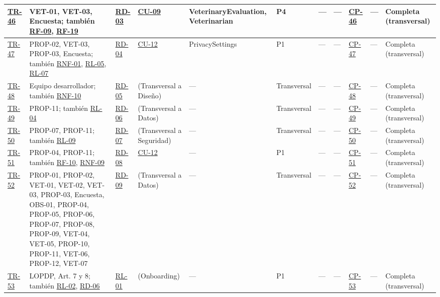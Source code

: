 \documentclass[journal,onecolumn]{IEEEtran}
\begin{document}
\begin{landscape}
\begin{longtable}{@{}p{0.8cm} p{4.0cm} p{1.3cm} p{1.7cm} p{2.5cm} p{1.0cm} p{1.9cm} p{0.9cm} p{0.9cm} p{1.75cm} p{2.2cm}@{}}
			\hyperref[tr:46]{TR-46}\label{tr:46} & VET-01, VET-03, Encuesta; también \hyperref[tab:RF-09]{RF-09}, \hyperref[tab:RF-19]{RF-19} & \hyperref[tab:RD-03]{RD-03} & \hyperref[tab:CU-09]{CU-09} & VeterinaryEvaluation, Veterinarian & P4 & --- & --- & \hyperref[cp:46]{CP-46} & --- & Completa (transversal) \\ \midrule
			\hyperref[tr:47]{TR-47}\label{tr:47} & PROP-02, VET-03, PROP-03, Encuesta; también \hyperref[tab:RNF-01]{RNF-01}, \hyperref[rl:05]{RL-05}, \hyperref[rl:07]{RL-07} & \hyperref[tab:RD-04]{RD-04} & \hyperref[tab:CU-12]{CU-12} & PrivacySettings & P1 & --- & --- & \hyperref[cp:47]{CP-47} & --- & Completa (transversal) \\ \midrule
			\hyperref[tr:48]{TR-48}\label{tr:48} & Equipo desarrollador; también \hyperref[tab:RNF-10]{RNF-10} & \hyperref[tab:RD-05]{RD-05} & (Transversal a Diseño) & --- & Transversal & --- & --- & \hyperref[cp:48]{CP-48} & --- & Completa (transversal) \\ \midrule
			\hyperref[tr:49]{TR-49}\label{tr:49} & PROP-11; también \hyperref[rl:04]{RL-04} & \hyperref[tab:RD-06]{RD-06} & (Transversal a Datos) & --- & Transversal & --- & --- & \hyperref[cp:49]{CP-49} & --- & Completa (transversal) \\ \midrule
			\hyperref[tr:50]{TR-50}\label{tr:50} & PROP-07, PROP-11; también \hyperref[rl:09]{RL-09} & \hyperref[tab:RD-07]{RD-07} & (Transversal a Seguridad) & --- & Transversal & --- & --- & \hyperref[cp:50]{CP-50} & --- & Completa (transversal) \\ \midrule
			\hyperref[tr:51]{TR-51}\label{tr:51} & PROP-04, PROP-11; también \hyperref[tab:RF-10]{RF-10}, \hyperref[tab:RNF-09]{RNF-09} & \hyperref[tab:RD-08]{RD-08} & \hyperref[tab:CU-12]{CU-12} & --- & P1 & --- & --- & \hyperref[cp:51]{CP-51} & --- & Completa (transversal) \\ \midrule
			\hyperref[tr:52]{TR-52}\label{tr:52} & PROP-01, PROP-02, VET-01, VET-02, VET-03, PROP-03, Encuesta, OBS-01, PROP-04, PROP-05, PROP-06, PROP-07, PROP-08, PROP-09, VET-04, VET-05, PROP-10, PROP-11, VET-06, PROP-12, VET-07 & \hyperref[tab:RD-09]{RD-09} & (Transversal a Datos) & --- & Transversal & --- & --- & \hyperref[cp:52]{CP-52} & --- & Completa (transversal) \\ \midrule
			\hyperref[tr:53]{TR-53}\label{tr:53} & LOPDP, Art. 7 y 8; también \hyperref[rl:02]{RL-02}, \hyperref[tab:RD-06]{RD-06} & \hyperref[rl:01]{RL-01} & (Onboarding) & --- & P1 & --- & --- & \hyperref[cp:53]{CP-53} & --- & Completa (transversal) \\ \midrule

\end{longtable}
\end{landscape}
\end{document}

